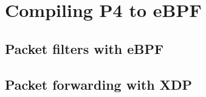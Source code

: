 \section{Compiling P4 to eBPF}\label{sec:compilation}

\subsection{Packet filters with eBPF}

\subsection{Packet forwarding with XDP}
